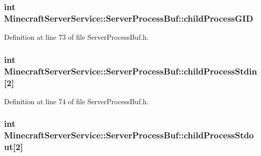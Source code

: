 \subsubsection[{\texorpdfstring{child\+Process\+G\+ID}{childProcessGID}}]{\setlength{\rightskip}{0pt plus 5cm}int Minecraft\+Server\+Service\+::\+Server\+Process\+Buf\+::child\+Process\+G\+ID\hspace{0.3cm}{\ttfamily [private]}}\hypertarget{class_minecraft_server_service_1_1_server_process_buf_a17107a275ac36684cc46ad283ca9bfab}{}\label{class_minecraft_server_service_1_1_server_process_buf_a17107a275ac36684cc46ad283ca9bfab}


Definition at line 73 of file Server\+Process\+Buf.\+h.

\subsubsection[{\texorpdfstring{child\+Process\+Stdin}{childProcessStdin}}]{\setlength{\rightskip}{0pt plus 5cm}int Minecraft\+Server\+Service\+::\+Server\+Process\+Buf\+::child\+Process\+Stdin\mbox{[}2\mbox{]}\hspace{0.3cm}{\ttfamily [private]}}\hypertarget{class_minecraft_server_service_1_1_server_process_buf_a41c2c016c722f040450e4825c70c5302}{}\label{class_minecraft_server_service_1_1_server_process_buf_a41c2c016c722f040450e4825c70c5302}


Definition at line 74 of file Server\+Process\+Buf.\+h.

\subsubsection[{\texorpdfstring{child\+Process\+Stdout}{childProcessStdout}}]{\setlength{\rightskip}{0pt plus 5cm}int Minecraft\+Server\+Service\+::\+Server\+Process\+Buf\+::child\+Process\+Stdout\mbox{[}2\mbox{]}\hspace{0.3cm}{\ttfamily [private]}}\hypertarget{class_minecraft_server_service_1_1_server_process_buf_a921657ec0367eaf98d4eb997b279731d}{}\label{class_minecraft_server_service_1_1_server_process_buf_a921657ec0367eaf98d4eb997b279731d}


